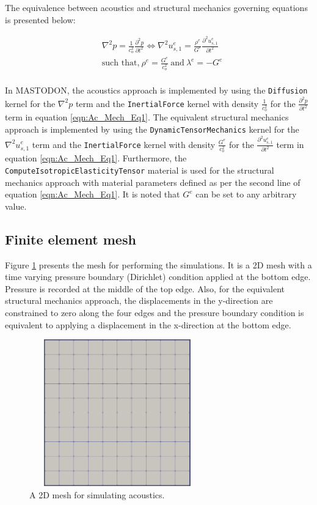 \documentclass[3p]{elsarticle}
\begin{document}
\noindent The equivalence between acoustics and structural mechanics governing equations is presented below:

\begin{equation}
    \label{eqn:Ac_Mech_Eq1}
    \begin{aligned}
        &\nabla^2p = \frac{1}{c_o^2}\frac{\partial^2p}{\partial t^2} \iff \nabla^2u^e_{s,1} = \frac{\rho^e}{G^e}\frac{\partial^2u^e_{s,1}}{\partial t^2}\\
       &\textrm{such that,}~\rho^e = \frac{G^e}{c_o^2}~\textrm{and}~\lambda^e = -G^e\\
    \end{aligned}
\end{equation}

\noindent In MASTODON, the acoustics approach is implemented by using the \texttt{Diffusion} kernel for the $\nabla^2p$ term and the \texttt{InertialForce} kernel with density $\frac{1}{c_o^2}$ for the $\frac{\partial^2p}{\partial t^2}$ term in equation \eqref{eqn:Ac_Mech_Eq1}. The equivalent structural mechanics approach is implemented by using the \texttt{DynamicTensorMechanics} kernel for the $\nabla^2u^e_{s,1}$ term and the \texttt{InertialForce} kernel with density $\frac{G^e}{c_o^2}$ for the $\frac{\partial^2u^e_{s,1}}{\partial t^2}$ term in equation \eqref{eqn:Ac_Mech_Eq1}. Furthermore, the \texttt{ComputeIsotropicElasticityTensor} material is used for the structural mechanics approach with material parameters defined as per the second line of equation \eqref{eqn:Ac_Mech_Eq1}. It is noted that $G^e$ can be set to any arbitrary value.

\subsection{Finite element mesh}

\noindent Figure \ref{fig:Mesh} presents the mesh for performing the simulations. It is a 2D mesh with a time varying pressure boundary (Dirichlet) condition applied at the bottom edge. Pressure is recorded at the middle of the top edge. Also, for the equivalent structural mechanics approach, the displacements in the y-direction are constrained to zero along the four edges and the pressure boundary condition is equivalent to applying a displacement in the x-direction at the bottom edge.

\begin{figure}[H]
\centering
\includegraphics[width=3in, height=2.5in]{Mesh.png} 
\caption{A 2D mesh for simulating acoustics.}
\label{fig:Mesh}
\end{figure}
\end{document}
